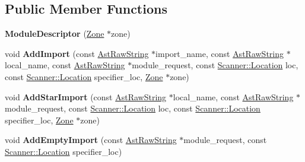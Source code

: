 \subsection*{Public Member Functions}
\begin{DoxyCompactItemize}
\item 
\mbox{\label{classv8_1_1internal_1_1ModuleDescriptor_aa9a5266f9aafaf52e3bf90d3ce3732cb}} 
{\bfseries Module\+Descriptor} (\mbox{\hyperlink{classv8_1_1internal_1_1Zone}{Zone}} $\ast$zone)
\item 
\mbox{\label{classv8_1_1internal_1_1ModuleDescriptor_ac40c13c6e69b6d5bd0d4994046e0629a}} 
void {\bfseries Add\+Import} (const \mbox{\hyperlink{classv8_1_1internal_1_1AstRawString}{Ast\+Raw\+String}} $\ast$import\+\_\+name, const \mbox{\hyperlink{classv8_1_1internal_1_1AstRawString}{Ast\+Raw\+String}} $\ast$local\+\_\+name, const \mbox{\hyperlink{classv8_1_1internal_1_1AstRawString}{Ast\+Raw\+String}} $\ast$module\+\_\+request, const \mbox{\hyperlink{structv8_1_1internal_1_1Scanner_1_1Location}{Scanner\+::\+Location}} loc, const \mbox{\hyperlink{structv8_1_1internal_1_1Scanner_1_1Location}{Scanner\+::\+Location}} specifier\+\_\+loc, \mbox{\hyperlink{classv8_1_1internal_1_1Zone}{Zone}} $\ast$zone)
\item 
\mbox{\label{classv8_1_1internal_1_1ModuleDescriptor_a71c63d97be380a475c6ed21649473930}} 
void {\bfseries Add\+Star\+Import} (const \mbox{\hyperlink{classv8_1_1internal_1_1AstRawString}{Ast\+Raw\+String}} $\ast$local\+\_\+name, const \mbox{\hyperlink{classv8_1_1internal_1_1AstRawString}{Ast\+Raw\+String}} $\ast$module\+\_\+request, const \mbox{\hyperlink{structv8_1_1internal_1_1Scanner_1_1Location}{Scanner\+::\+Location}} loc, const \mbox{\hyperlink{structv8_1_1internal_1_1Scanner_1_1Location}{Scanner\+::\+Location}} specifier\+\_\+loc, \mbox{\hyperlink{classv8_1_1internal_1_1Zone}{Zone}} $\ast$zone)
\item 
\mbox{\label{classv8_1_1internal_1_1ModuleDescriptor_a8256e4f9ae01cd342b4aa344957d0e4f}} 
void {\bfseries Add\+Empty\+Import} (const \mbox{\hyperlink{classv8_1_1internal_1_1AstRawString}{Ast\+Raw\+String}} $\ast$module\+\_\+request, const \mbox{\hyperlink{structv8_1_1internal_1_1Scanner_1_1Location}{Scanner\+::\+Location}} specifier\+\_\+loc)

\end{DoxyCompactItemize}
